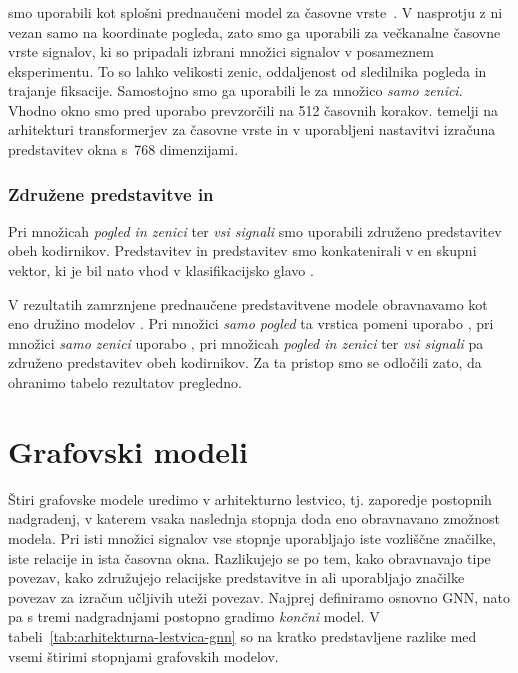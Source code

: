 \subsubsection*{}
\label{subsec:moment-model}

 smo uporabili kot splošni prednaučeni model za časovne vrste~\cite{goswami2024moment}.
V nasprotju z  ni vezan samo na koordinate pogleda, zato smo ga uporabili za večkanalne časovne vrste signalov, ki so pripadali izbrani množici signalov v posameznem eksperimentu.
To so lahko velikosti zenic, oddaljenost od sledilnika pogleda in trajanje fiksacije.
Samostojno smo ga uporabili le za množico \emph{samo zenici}.
Vhodno okno smo pred uporabo prevzorčili na 512 časovnih korakov.
 temelji na arhitekturi transformerjev za časovne vrste in v uporabljeni nastavitvi izračuna predstavitev okna s~768 dimenzijami.

\subsubsection*{Združene predstavitve  in }

Pri množicah \emph{pogled in zenici} ter \emph{vsi signali} smo uporabili združeno predstavitev obeh kodirnikov.
Predstavitev  in predstavitev  smo konkatenirali v en skupni vektor, ki je bil nato vhod v klasifikacijsko glavo .

V rezultatih zamrznjene prednaučene predstavitvene modele obravnavamo kot eno družino modelov .
Pri množici \emph{samo pogled} ta vrstica pomeni uporabo , pri množici \emph{samo zenici} uporabo , pri množicah \emph{pogled in zenici} ter \emph{vsi signali} pa združeno predstavitev obeh kodirnikov. 
Za ta pristop smo se odločili zato, da ohranimo tabelo rezultatov pregledno.


\section{Grafovski modeli}
\label{subsec:grafovski-modeli}

Štiri grafovske modele uredimo v arhitekturno lestvico, tj. zaporedje postopnih nadgradenj, v katerem vsaka naslednja stopnja doda eno obravnavano zmožnost modela.
Pri isti množici signalov vse stopnje uporabljajo iste vozliščne značilke, iste relacije in ista časovna okna.
Razlikujejo se po tem, kako obravnavajo tipe povezav, kako združujejo relacijske predstavitve in ali uporabljajo značilke povezav za izračun učljivih uteži povezav.
Najprej definiramo osnovno GNN, nato pa s tremi nadgradnjami postopno gradimo \emph{končni} model.
V tabeli~\ref{tab:arhitekturna-lestvica-gnn} so na kratko predstavljene razlike med vsemi štirimi stopnjami grafovskih modelov.

